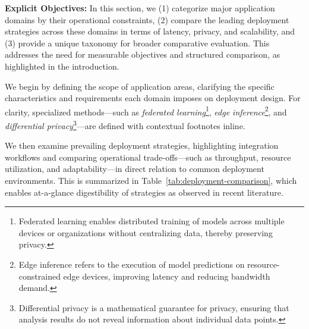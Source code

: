 \documentclass[sigconf]{acmart}
\begin{document}
\textbf{Explicit Objectives:} In this section, we (1) categorize major application domains by their operational constraints, (2) compare the leading deployment strategies across these domains in terms of latency, privacy, and scalability, and (3) provide a unique taxonomy for broader comparative evaluation. This addresses the need for measurable objectives and structured comparison, as highlighted in the introduction.

We begin by defining the scope of application areas, clarifying the specific characteristics and requirements each domain imposes on deployment design. For clarity, specialized methods---such as \emph{federated learning}\footnote{Federated learning enables distributed training of models across multiple devices or organizations without centralizing data, thereby preserving privacy.}, \emph{edge inference}\footnote{Edge inference refers to the execution of model predictions on resource-constrained edge devices, improving latency and reducing bandwidth demand.}, and \emph{differential privacy}\footnote{Differential privacy is a mathematical guarantee for privacy, ensuring that analysis results do not reveal information about individual data points.}---are defined with contextual footnotes inline.

We then examine prevailing deployment strategies, highlighting integration workflows and comparing operational trade-offs---such as throughput, resource utilization, and adaptability---in direct relation to common deployment environments. This is summarized in Table~\ref{tab:deployment-comparison}, which enables at-a-glance digestibility of strategies as observed in recent literature.
\end{document}

